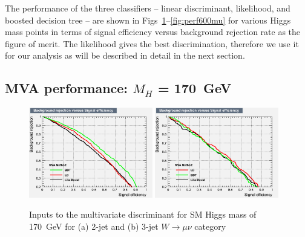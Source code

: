 
The performance of the three classifiers -- linear discriminant, 
likelihood, and boosted decision tree -- 
are shown in Figs~\ref{fig:perf170mu}--\ref{fig:perf600mu}
for various Higgs mass points in terms of signal efficiency versus background rejection rate 
as the figure of merit.
The likelihood gives the best discrimination, therefore we use it 
for our analysis as will be described in detail in the next section.
\subsection{MVA performance: \texorpdfstring{$M_H$}{M(H)} = 170~GeV}
\begin{figure}[ht]
  \centering
  \includegraphics[width=0.48\textwidth]{figs/TMVA_170_nJ2_mu_rejBvsS}
  \includegraphics[width=0.48\textwidth]{figs/TMVA_170_nJ3_mu_rejBvsS}	
  \caption{\label{fig:perf170mu}Inputs to the multivariate discriminant for SM Higgs mass of 170~GeV for (a) 2-jet and (b) 3-jet $W\to\mu\nu$ category}
\end{figure}
